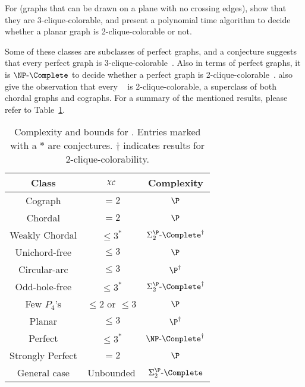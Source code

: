 For  (graphs that can be drawn on a plane with no crossing edges), \cite{clique_coloring_planar} show that they are 3-clique-colorable, and \cite{clique_color_perfect_np_complete} present a polynomial time algorithm to decide whether a planar graph is 2-clique-colorable or not.

Some of these classes are subclasses of perfect graphs, and a conjecture suggests that every perfect graph is 3-clique-colorable~\citep{maximal_clique_coloring}.
Also in terms of perfect graphs, it is $\NPc$ to decide whether a perfect graph is 2-clique-colorable~\citep{clique_color_perfect_np_complete}.
\cite{clique_oddhole} also give the observation that every ~\citep{strongly_perfect} is 2-clique-colorable, a superclass of both chordal graphs and cographs.
For a summary of the mentioned results, please refer to Table~\ref{tab:clique_color_complexity}.

\begin{table}[!htb]
    \centering
    \begin{tabular}{c|c|c}
        \hline
        \hline
        Class            & $\chi_{\mathcal{C}}$             & Complexity \\
        \hline
        Cograph          & $= 2$                & $\P$\\
        Chordal          & $= 2$                & $\P$\\
        Weakly Chordal   & $\leq 3^*$           & $\SiP{2}\text{-}\Complete^\dag$\\
        Unichord-free    & $\leq 3 $            & $\P$ \\
        Circular-arc     & $\leq 3$             & $\P^\dag$ \\
        Odd-hole-free    & $\leq 3^*$           & $\SiP{2}\text{-}\Complete^\dag$\\
        Few $P_4$'s      & $\leq 2$ or $\leq 3$ & $\P$\\
        Planar           & $\leq 3$             & $\P^\dag$\\
        Perfect          & $\leq 3^*$           & $\NPc^\dag$\\ 
        Strongly Perfect & $= 2$                & $\P$\\
        General case     & Unbounded            & $\SiP{2}\text{-}\Complete$\\
        \hline
        \hline
    \end{tabular}
    \caption{Complexity and bounds for . Entries marked with a $*$ are conjectures. $\dag$ indicates results for 2-clique-colorability.}
    \label{tab:clique_color_complexity}
\end{table}

